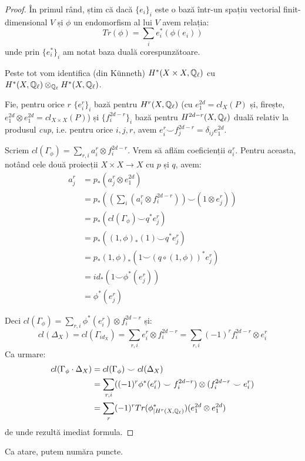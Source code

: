\documentclass[13pt,openany]{book}
\begin{document}
\begin{proof}
În primul rând, știm că dacă $\{e_i\}_i$ este o bază într-un spațiu vectorial finit-dimensional $V$ și $\phi$ un endomorfism al lui $V$ avem relația:
$$Tr(\phi)=\sum\limits_i e_i^*(\phi(e_i))$$
unde prin $\{e_i^*\}_i$ am notat baza duală corespunzătoare.

Peste tot vom identifica (din Künneth) $H^*(X\times X,\mathbb{Q}_\ell)$ cu $H^*(X,\mathbb{Q}_\ell) \otimes_{\mathbb{Q}_\ell} H^*(X,\mathbb{Q}_\ell)$.

Fie, pentru orice $r$ $\{e_i^r\}_i$ bază pentru $H^r(X,\mathbb{Q}_\ell)$ (cu $e^{2d}_1=cl_X(P)$ și, firește, $e^{2d}_1 \otimes e^{2d}_1 = cl_{X\times X}(P)$) și $\{f_i^{2d-r}\}_i$ bază pentru $H^{2d-r}(X,\mathbb{Q}_\ell)$ duală relativ la produsul {\it cup}, i.e. pentru orice $i,j,r$, avem $e_i^r \smile f_j^{2d-r} = \delta_{ij}e^{2d}_1$.

Scriem $cl(\Gamma_\phi)=\sum\limits_{r,i} a_i^r \otimes f_i^{2d-r}$. Vrem să aflăm coeficienții $a_i^r$. Pentru aceasta, notând cele două proiecții $X \times X \rightarrow X$ cu $p$ și $q$, avem:
\begin{align*}
a^r_j&=p_*(a^r_j \otimes e^{2d}_1)\\
&=p_* ((\sum\limits_i (a^r_i \otimes f^{2d-r}_i)) \smile (1 \otimes e^r_j)) \\
&= p_*(cl(\Gamma_\phi) \smile q^* e^r_j) \\
&= p_*( (1,\phi)_*(1) \smile q^* e^r_j) \\
&= p_* (1,\phi)_* (1 \smile (q \circ (1,\phi))^*e_j^r)\\
&= id_*(1 \smile \phi^*(e_j^r))\\
&= \phi^*(e_j^r)
\end{align*}

Deci $cl(\Gamma_\phi)=\sum\limits_{r,i} \phi^*(e^r_i) \otimes f^{2d-r}_i$ și:
$$cl(\Delta_X)=cl(\Gamma_{id_X})=\sum\limits_{r,i} e^r_i \otimes f^{2d-r}_i = \sum\limits_{r,i} (-1)^r f_i^{2d-r} \otimes e^r_i$$
Ca urmare:
\begin{align*}
cl(\Gamma_\phi \cdot \Delta_X) &= cl(\Gamma_\phi) \smile cl(\Delta_X) \\
&= \sum\limits_{r,i} ((-1)^r \phi^*(e^r_i) \smile f^{2d-r}_i) \otimes (f^{2d-r}_i \smile e^r_i) \\
&= \sum\limits_r (-1)^r Tr(\phi^*_{\mid H^r(X,\mathbb{Q}_\ell)}) (e^{2d}_1 \otimes e^{2d}_1)
\end{align*}
de unde rezultă imediat formula.
\end{proof}

Ca atare, putem număra puncte.
\end{document}
